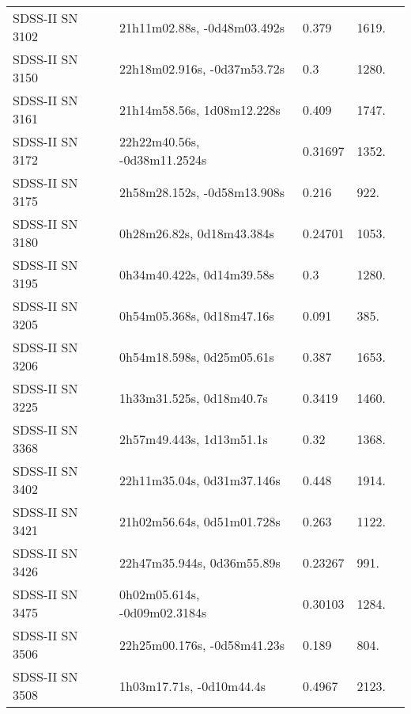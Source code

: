 \begin{longtable}{lllll}
  SDSS-II SN 3102 &    21h11m02.88s, -0d48m03.492s &    0.379 &          1619. &    \citet{2011ApJ...738..162S} \\
  SDSS-II SN 3150 &    22h18m02.916s, -0d37m53.72s &      0.3 &          1280. &    \citet{2011ApJ...738..162S} \\
  SDSS-II SN 3161 &     21h14m58.56s, 1d08m12.228s &    0.409 &          1747. &    \citet{2011ApJ...738..162S} \\
  SDSS-II SN 3172 &   22h22m40.56s, -0d38m11.2524s &  0.31697 &          1352. &    \citet{2016SDSSD.C...0000:} \\
  SDSS-II SN 3175 &    2h58m28.152s, -0d58m13.908s &    0.216 &           922. &    \citet{2011ApJ...738..162S} \\
  SDSS-II SN 3180 &      0h28m26.82s, 0d18m43.384s &  0.24701 &          1053. &    \citet{2016SDSSD.C...0000:} \\
  SDSS-II SN 3195 &      0h34m40.422s, 0d14m39.58s &      0.3 &          1280. &    \citet{2011ApJ...738..162S} \\
  SDSS-II SN 3205 &      0h54m05.368s, 0d18m47.16s &    0.091 &           385. &    \citet{2011ApJ...738..162S} \\
  SDSS-II SN 3206 &      0h54m18.598s, 0d25m05.61s &    0.387 &          1653. &    \citet{2010ApJ...713.1026D} \\
  SDSS-II SN 3225 &       1h33m31.525s, 0d18m40.7s &   0.3419 &          1460. &    \citet{2011ApJ...738..162S} \\
  SDSS-II SN 3368 &       2h57m49.443s, 1d13m51.1s &     0.32 &          1368. &    \citet{2010ApJ...713.1026D} \\
  SDSS-II SN 3402 &     22h11m35.04s, 0d31m37.146s &    0.448 &          1914. &    \citet{2011ApJ...738..162S} \\
  SDSS-II SN 3421 &     21h02m56.64s, 0d51m01.728s &    0.263 &          1122. &    \citet{2011ApJ...738..162S} \\
  SDSS-II SN 3426 &     22h47m35.944s, 0d36m55.89s &  0.23267 &           991. &    \citet{2013ApJ...763...88C} \\
  SDSS-II SN 3475 &   0h02m05.614s, -0d09m02.3184s &  0.30103 &          1284. &    \citet{2016SDSSD.C...0000:} \\
  SDSS-II SN 3506 &    22h25m00.176s, -0d58m41.23s &    0.189 &           804. &    \citet{2011ApJ...738..162S} \\
  SDSS-II SN 3508 &       1h03m17.71s, -0d10m44.4s &   0.4967 &          2123. &    \citet{2011ApJ...738..162S} \\

\end{longtable}
